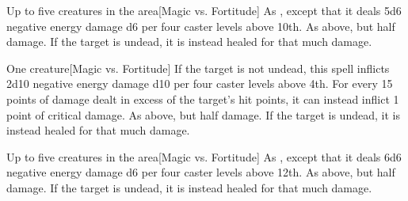 \begin{spellheader}
\end{spellheader}
\begin{spelleffects}
    \begin{spelltargets}{Up to five creatures in the area}[Magic vs. Fortitude]
        \spellsuccess As , except that it deals 5d6 negative energy damage \add d6 per four caster levels above 10th.
        \spellfailure As above, but half damage.
        \spelleffect If the target is undead, it is instead healed for that much damage.
    \end{spelltargets}
\end{spelleffects}

\begin{spellheader}
    \spellrng{\rngclose}
\end{spellheader}
\begin{spelleffects}
    \begin{spelltarget}{One creature}[Magic vs. Fortitude]
        \spellsuccess If the target is not undead, this spell inflicts 2d10 negative energy damage \add d10 per four caster levels above 4th. For every 15 points of damage dealt in excess of the target's hit points, it can instead inflict 1 point of critical damage.
        \spellfailure As above, but half damage.
        \spelleffect If the target is undead, it is instead healed for that much damage.
    \end{spelltarget}
\end{spelleffects}

\begin{spellheader}
\end{spellheader}
\begin{spelleffects}
    \begin{spelltargets}{Up to five creatures in the area}[Magic vs. Fortitude]
        \spellsuccess As , except that it deals 6d6 negative energy damage \add d6 per four caster levels above 12th.
        \spellfailure As above, but half damage.
        \spelleffect If the target is undead, it is instead healed for that much damage.
    \end{spelltargets}
\end{spelleffects}

